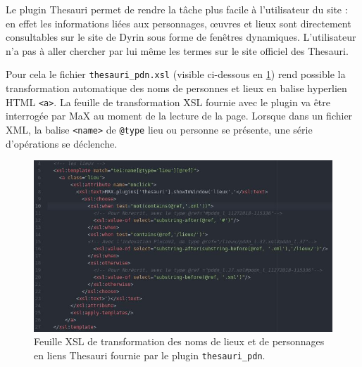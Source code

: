 \documentclass[a4paper,12pt,twoside]{book}
\begin{document}
Le plugin Thesauri permet de rendre la tâche plus facile à l'utilisateur du site : en effet les informations liées aux personnages, \oe{}uvres et lieux sont directement consultables sur le site de Dyrin sous forme de fenêtres dynamiques. L'utilisateur n'a pas à aller chercher par lui même les termes sur le site officiel des Thesauri.


Pour cela le fichier \texttt{thesauri\_pdn.xsl} (visible ci-dessous en \ref{lieux_xsl}) rend possible la transformation automatique des noms de personnes et lieux en balise hyperlien \acrshort{HTML} \texttt{<a>}. La feuille de transformation \acrshort{XSL} fournie avec le plugin  va être interrogée par MaX au moment de la lecture de la page. Lorsque dans un fichier XML, la balise \texttt{<name>} de \texttt{@type} \og lieu\fg{} ou \og personne\fg{} se présente, une série d'opérations se déclenche.

\begin{figure}[H]
    \centering
    \includegraphics[width=12cm]{img/partie_3/lieux_xsl.JPG}
    \caption{Feuille \acrshort{XSL} de transformation des noms de lieux et de personnages en liens Thesauri fournie par le plugin \texttt{thesauri\_pdn}.}
    \label{lieux_xsl}
\end{figure}
\end{document}
